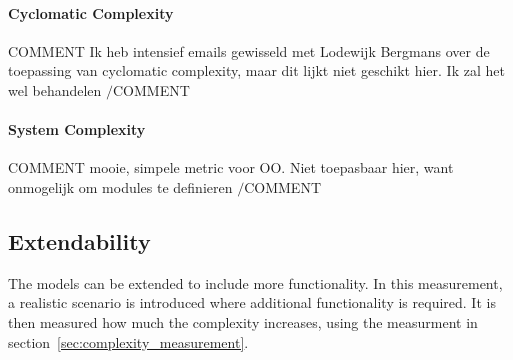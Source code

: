 \paragraph*{Cyclomatic Complexity} COMMENT Ik heb intensief emails gewisseld met Lodewijk Bergmans over de toepassing van cyclomatic complexity, maar dit lijkt niet geschikt hier. Ik zal het wel behandelen $/$COMMENT

\paragraph*{System Complexity} COMMENT mooie, simpele metric voor OO. Niet toepasbaar hier, want onmogelijk om modules te definieren $/$COMMENT

\subsection{Extendability}
The models can be extended to include more functionality. In this measurement, a realistic scenario is introduced where additional functionality is required. It is then measured how much the complexity increases, using the measurment in section~\ref{sec:complexity_measurement}.
